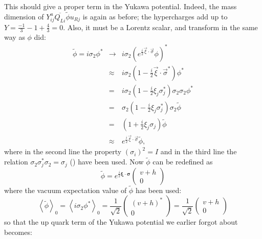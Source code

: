 This should give a proper term in the Yukawa potential. Indeed, the mass dimension of $Y^u_{ij}\overline{Q_{Li}}\tilde{\phi} u_{Rj}$ is again as before; the hypercharges add up to $Y= \frac{-1}{3} -1 + \frac{4}{3} = 0$. Also, it must be a Lorentz scalar, and transform in the same way as $\phi$ did:
\begin{eqnarray}
\tilde{\phi} = i\sigma_2\phi^* &\rightarrow& i\sigma_2\left(e^{\frac{i}{2}\vec{\xi} \cdot \vec{\sigma}} \phi \right)^* \nonumber \\
&\approx& i\sigma_2 \left( 1 - \frac{i}{2}\vec{\xi} \cdot \vec{\sigma}^* \right)\phi^* \nonumber \\
&=& i\sigma_2 \left( 1 - \frac{i}{2}\xi_j \sigma^*_j \right) \sigma_2 \sigma_2 \phi^* \nonumber \\
&=& \sigma_2 \left( 1 - \frac{i}{2}\xi_j \sigma^*_j \right) \sigma_2 \tilde{\phi} \nonumber \\
&=&  \left( 1 + \frac{i}{2}\xi_j \sigma_j \right) \tilde{\phi} \nonumber \\
&\approx& e^{\frac{i}{2}\vec{\xi} \cdot \vec{\sigma}} \tilde{\phi},
\label{eqn:trmfphitilde}
\end{eqnarray}
where in the second line the property $(\sigma_i)^2 = I$ and in the third line the relation $\sigma_2\sigma_j^*\sigma_2 = \sigma_j$ (\cite[p279]{ellis2003qcd}) have been used. Now $\tilde{\phi}$ can be redefined as 
\begin{equation}
\tilde{\phi} = e^{\frac{i}{2}\mathbf{\xi \cdot \sigma}}\left( \begin{array}{c} v+h \\ 0 \end{array} \right)
\label{eqn:phitildedefined}
\end{equation}
where the vacuum expectation value of $\tilde{\phi}$ has been used:
\begin{equation}
\left<\tilde{\phi}\right>_0 = \left<i\sigma_2\phi^*\right>_0 = \frac{1}{\sqrt{2}} \left( \begin{array}{c} (v + h)^* \\ 0 \end{array} \right) = \frac{1}{\sqrt{2}} \left( \begin{array}{c} v + h \\ 0 \end{array} \right)
\label{eqn:vevphitilde}
\end{equation}
so that the up quark term of the Yukawa potential we earlier forgot about becomes:

